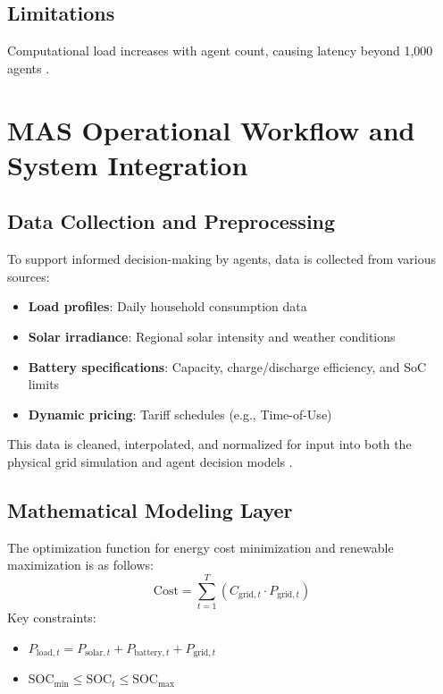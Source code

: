 \documentclass[12pt]{report}
\begin{document}
\section{Limitations}
\begin{doublespace}
Computational load increases with agent count, causing latency beyond 1,000 agents \cite{Zhang2021}.
\end{doublespace}

\chapter{MAS Operational Workflow and System Integration}
\thispagestyle{empty}
\section{Data Collection and Preprocessing}
\begin{doublespace}
To support informed decision-making by agents, data is collected from various sources:
\begin{itemize}
    \item \textbf{Load profiles}: Daily household consumption data
    \item \textbf{Solar irradiance}: Regional solar intensity and weather conditions
    \item \textbf{Battery specifications}: Capacity, charge/discharge efficiency, and SoC limits
    \item \textbf{Dynamic pricing}: Tariff schedules (e.g., Time-of-Use)
\end{itemize}
This data is cleaned, interpolated, and normalized for input into both the physical grid simulation and agent decision models \cite{MNRE2023}.
\end{doublespace}

\section{Mathematical Modeling Layer}
\begin{doublespace}
The optimization function for energy cost minimization and renewable maximization is as follows:
\begin{equation}
\text{Cost} = \sum_{t=1}^T (C_{\text{grid},t} \cdot P_{\text{grid},t})
\end{equation}
Key constraints:
\begin{itemize}
    \item \( P_{\text{load},t} = P_{\text{solar},t} + P_{\text{battery},t} + P_{\text{grid},t} \)
    \item \( \text{SOC}_{\text{min}} \leq \text{SOC}_t \leq \text{SOC}_{\text{max}} \)
\end{itemize}
\end{doublespace}
\end{document}
